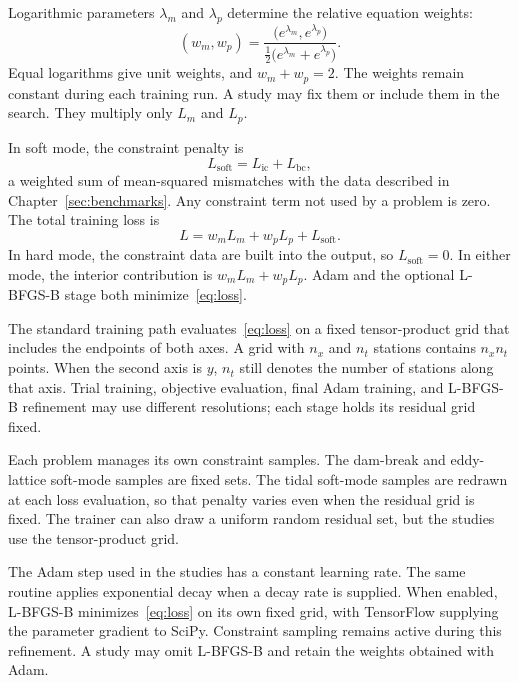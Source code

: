 \documentclass{erdc}
\begin{document}
Logarithmic parameters \(\lambda_{m}\) and \(\lambda_{p}\) determine the
relative equation weights:
\begin{equation}
\label{eq:weights}
(w_{m},w_{p})
=
\frac{\big(e^{\lambda_{m}},e^{\lambda_{p}}\big)}
{\tfrac{1}{2}\big(e^{\lambda_{m}}+e^{\lambda_{p}}\big)}.
\end{equation}
Equal logarithms give unit weights, and \(w_{m}+w_{p}=2\). The weights
remain constant during each training run. A study may fix them or
include them in the search. They multiply only \(L_{m}\) and \(L_{p}\).

In soft mode, the constraint penalty is
\begin{equation}
\label{eq:lsoft}
L_{\mathrm{soft}}=L_{\mathrm{ic}}+L_{\mathrm{bc}},
\end{equation}
a weighted sum of mean-squared mismatches with the data described in
Chapter~\ref{sec:benchmarks}. Any constraint term not used by a problem
is zero. The total training loss is
\begin{equation}
\label{eq:loss}
L=w_{m}L_{m}+w_{p}L_{p}+L_{\mathrm{soft}}.
\end{equation}
In hard mode, the constraint data are built into the output, so
\(L_{\mathrm{soft}}=0\). In either mode, the interior contribution is
\(w_{m}L_{m}+w_{p}L_{p}\). Adam and the optional L-BFGS-B stage both
minimize~\eqref{eq:loss}.

The standard training path evaluates~\eqref{eq:loss} on a fixed
tensor-product grid that includes the endpoints of both axes. A grid
with \(n_{x}\) and \(n_{t}\) stations contains \(n_{x}n_{t}\) points.
When the second axis is \(y\), \(n_{t}\) still denotes the number of
stations along that axis. Trial training, objective evaluation, final
Adam training, and L-BFGS-B refinement may use different resolutions;
each stage holds its residual grid fixed.

Each problem manages its own constraint samples. The dam-break and
eddy-lattice soft-mode samples are fixed sets. The tidal soft-mode
samples are redrawn at each loss evaluation, so that penalty varies
even when the residual grid is fixed. The trainer can also draw a
uniform random residual set, but the studies use the tensor-product
grid.

The Adam step used in the studies has a constant learning rate. The
same routine applies exponential decay when a decay rate is supplied.
When enabled, L-BFGS-B minimizes~\eqref{eq:loss} on its own fixed grid,
with TensorFlow supplying the parameter gradient to SciPy. Constraint
sampling remains active during this refinement. A study may omit
L-BFGS-B and retain the weights obtained with Adam.
\end{document}
